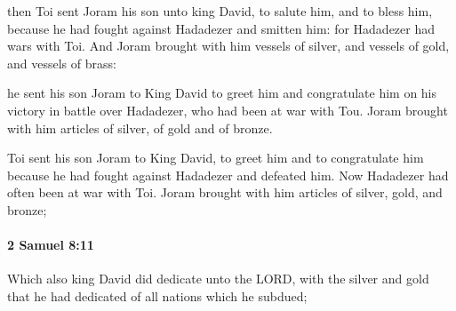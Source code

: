 			\begin{versebox}
					\item[BHS] 
					\item[ASV] then Toi sent Joram his son unto king David, to salute him, and to bless him, because he had fought against Hadadezer and smitten him: for Hadadezer had wars with Toi. And Joram brought with him vessels of silver, and vessels of gold, and vessels of brass:
					\item[NIV] he sent his son Joram to King David to greet him and congratulate him on his victory in battle over Hadadezer, who had been at war with Tou. Joram brought with him articles of silver, of gold and of bronze.
					\item[NRSV] Toi sent his son Joram to King David, to greet him and to congratulate him because he had fought against Hadadezer and defeated him. Now Hadadezer had often been at war with Toi. Joram brought with him articles of silver, gold, and bronze;
			\end{versebox}

		\paragraph{2 Samuel 8:11} %
			\label{2SAMUEL-8-11}

			Which also king David did dedicate unto the LORD, with the silver and gold that he had dedicated of all nations which he subdued;

